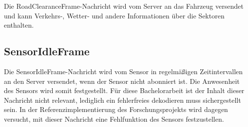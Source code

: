 Die RoadClearanceFrame-Nachricht wird vom Server an das Fahrzeug versendet und kann Verkehrs-, Wetter- und andere Informationen über die Sektoren enthalten.

\subsection{SensorIdleFrame}
\label{msg:sensor_idle_frame}

Die SensorIdleFrame-Nachricht wird vom Sensor in regelmäßigen Zeitintervallen an den Server versendet, wenn der Sensor nicht abonniert ist.
Die Anwesenheit des Sensors wird somit festgestellt.
Für diese Bachelorarbeit ist der Inhalt dieser Nachricht nicht relevant, lediglich ein fehlerfreies dekodieren muss sichergestellt sein.
In der Referenzimplementierung des Forschungsprojekts wird dagegen versucht, mit dieser Nachricht eine Fehlfunktion des Sensors festzustellen.


%		
%		
%		


